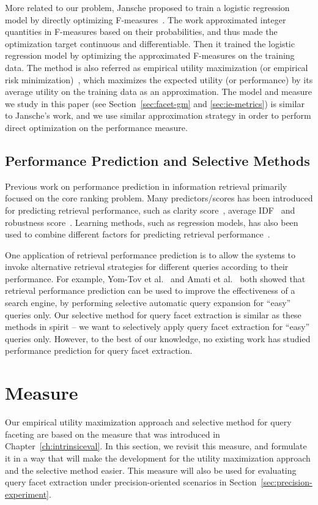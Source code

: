 More related to our problem, Jansche proposed to train a logistic regression model by directly optimizing F-measures~\cite{jansche2005maximum}. The work approximated integer quantities in F-measures based on their probabilities, and thus made the optimization target continuous and differentiable. Then it trained the logistic regression model by optimizing the approximated F-measures on the training data. The method is also referred as empirical utility maximization (or empirical risk minimization)~\cite{ye2012optimizing}, which maximizes the expected utility (or performance) by its average utility on the training data as an approximation. The model and measure we study in this paper (see Section~\ref{sec:facet-gm} and \ref{sec:ie-metrics}) is similar to Jansche's work, and we use similar approximation strategy in order to perform direct optimization on the performance measure.

\subsection{Performance Prediction and Selective Methods}
Previous work on performance prediction in information retrieval primarily focused on the core ranking problem. Many predictors/scores has been introduced for predicting retrieval performance, such as clarity score~\cite{cronen2002predicting}, average IDF~\cite{tomlinson2004robust} and robustness score~\cite{zhou2006ranking}. Learning methods, such as regression models, has also been used to combine different factors for predicting retrieval performance~\cite{kwok2004trec,balasubramanian2010predicting,yom2005learning}. 

One application of retrieval performance prediction is to allow the systems to invoke alternative retrieval strategies for different queries according to their performance. For example, Yom-Tov et al.~\cite{yom2005learning} and Amati et al.~\cite{amati2004query} both showed that retrieval performance prediction can be used to improve the effectiveness of a search engine, by performing selective
automatic query expansion for ``easy'' queries only. Our selective method for query facet extraction is similar as these methods in spirit -- we want to selectively apply query facet extraction for ``easy'' queries only. However, to the best of our knowledge, no existing work has studied performance prediction for query facet extraction.

\section{\PRF Measure}
\label{sec:precision-measure}
Our empirical utility maximization approach and selective method for query faceting are based on the \PRF measure that was introduced in Chapter~\ref{ch:intrinsiceval}. In this section, we revisit this measure, and formulate it in a way that will make the development for the utility maximization approach and the selective method easier. This measure will also be used for evaluating query facet extraction under precision-oriented scenarios in Section~\ref{sec:precision-experiment}.

